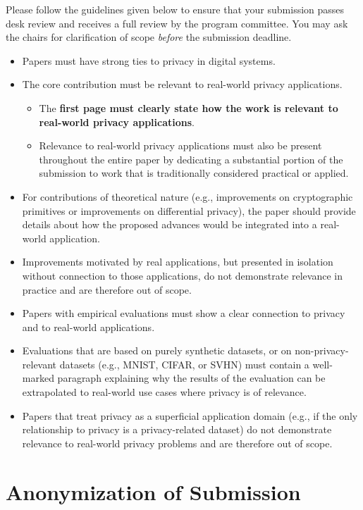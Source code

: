 \documentclass[sigconf,anonymous,review]{acmart}
\begin{document}
Please follow the guidelines given below to ensure that your submission passes
desk review and receives a full review by the program committee. You may ask the
chairs for clarification of scope \emph{before} the submission deadline.

\begin{itemize}
  \item Papers must have strong ties to privacy in digital systems.
  \item The core contribution must be relevant to real-world privacy applications.
  \begin{itemize}
    \item The \textbf{first page must clearly state how the work is relevant to
    real-world privacy applications}.
    \item Relevance to real-world privacy applications must also be present throughout the entire paper by dedicating a substantial portion of the submission to work that is traditionally considered practical or applied.
  \end{itemize}
  \item For contributions of theoretical nature (e.g., improvements on
  cryptographic primitives or improvements on differential privacy), the paper
  should provide details about how the proposed advances would be integrated
  into a real-world application.
  \item Improvements motivated by real applications, but presented in isolation
    without connection to those applications, do not demonstrate relevance in
    practice and are therefore out of scope.
    \item Papers with empirical evaluations must show a clear connection to
    privacy and to real-world applications.
  \item Evaluations that are based on purely synthetic datasets, or on
    non-privacy-relevant datasets (e.g., MNIST, CIFAR, or SVHN) must contain a
    well-marked paragraph explaining why the results of the evaluation can be
    extrapolated to real-world use cases where privacy is of relevance.
    \item Papers that treat privacy as a superficial application domain (e.g.,
    if the only relationship to privacy is a privacy-related dataset) do not
    demonstrate relevance to real-world privacy problems and are therefore out
    of scope.
\end{itemize}

\section{Anonymization of Submission}
\end{document}
